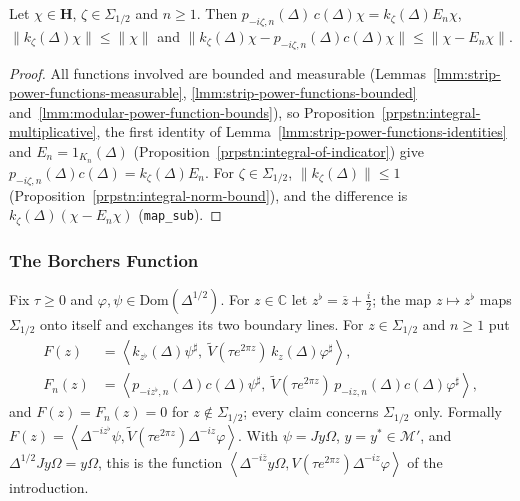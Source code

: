 \begin{lemma}
    \label{lmm:strip-power-cutoff}
    \leanok
    Let $\chi \in \mathbf{H}$, $\zeta \in \Sigma_{1/2}$ and $n \ge 1$. Then $p_{-i\zeta,n}(\Delta)\,c(\Delta)\chi = k_\zeta(\Delta)E_n\chi$, $\|k_\zeta(\Delta)\chi\| \le \|\chi\|$ and $\|k_\zeta(\Delta)\chi - p_{-i\zeta,n}(\Delta)c(\Delta)\chi\| \le \|\chi - E_n\chi\|$.
\end{lemma}
\begin{proof}
    \leanok
    All functions involved are bounded and measurable (Lemmas~\ref{lmm:strip-power-functions-measurable}, \ref{lmm:strip-power-functions-bounded} and~\ref{lmm:modular-power-function-bounds}), so Proposition~\ref{prpstn:integral-multiplicative}, the first identity of Lemma~\ref{lmm:strip-power-functions-identities} and $E_n = 1_{K_n}(\Delta)$ (Proposition~\ref{prpstn:integral-of-indicator}) give $p_{-i\zeta,n}(\Delta)c(\Delta) = k_\zeta(\Delta)E_n$. For $\zeta \in \Sigma_{1/2}$, $\|k_\zeta(\Delta)\| \le 1$ (Proposition~\ref{prpstn:integral-norm-bound}), and the difference is $k_\zeta(\Delta)(\chi - E_n\chi)$ (\texttt{map\_sub}).
\end{proof}

\subsubsection{The Borchers Function}

Fix $\tau \ge 0$ and $\varphi, \psi \in \text{Dom}(\Delta^{1/2})$. For $z \in \mathbb{C}$ let $z^\flat = \overline{z} + \tfrac{i}{2}$; the map $z \mapsto z^\flat$ maps $\Sigma_{1/2}$ onto itself and exchanges its two boundary lines. For $z \in \Sigma_{1/2}$ and $n \ge 1$ put
\begin{align}
    F(z) &= \left< k_{z^\flat}(\Delta)\psi^\sharp, \ \widetilde{V}(\tau e^{2\pi z})\,k_z(\Delta)\varphi^\sharp \right>, \\
    F_n(z) &= \left< p_{-iz^\flat,n}(\Delta)c(\Delta)\psi^\sharp, \ \widetilde{V}(\tau e^{2\pi z})\,p_{-iz,n}(\Delta)c(\Delta)\varphi^\sharp \right>,
\end{align}
and $F(z) = F_n(z) = 0$ for $z \notin \Sigma_{1/2}$; every claim concerns $\Sigma_{1/2}$ only. Formally $F(z) = \left< \Delta^{-iz^\flat}\psi, \widetilde{V}(\tau e^{2\pi z})\Delta^{-iz}\varphi \right>$. With $\psi = Jy\Omega$, $y = y^* \in \mathcal{M}'$, and $\Delta^{1/2}Jy\Omega = y\Omega$, this is the function $\left< \Delta^{-i\overline{z}}y\Omega, V(\tau e^{2\pi z})\Delta^{-iz}\varphi \right>$ of the introduction.

